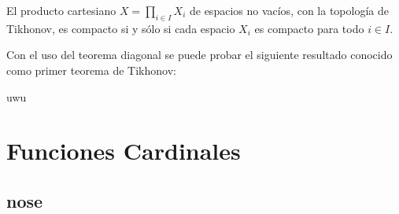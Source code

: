\documentclass[12pt]{report}
\theoremstyle{largebreak}
\begin{document}
    \begin{theor}
        El producto cartesiano $X=\prod_{i\in I}X_i$ de espacios no vacíos, con la topología de Tikhonov, es compacto si y sólo si cada espacio $X_i$ es compacto para todo $i\in I$.
    \end{theor}

    Con el uso del teorema diagonal se puede probar el siguiente resultado conocido como primer teorema de Tikhonov:

    \begin{theor}
        uwu
    \end{theor}


    \chapter{Funciones Cardinales}

    \section{nose}
\end{document}
